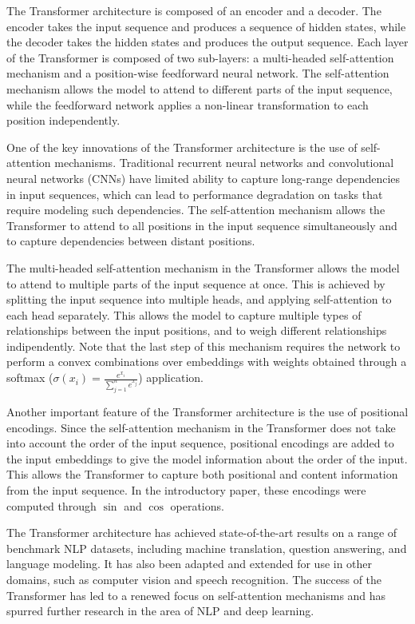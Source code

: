 \documentclass{article}
\begin{document}
The Transformer architecture is composed of an encoder and a decoder. The encoder takes the input sequence and produces a sequence of hidden states, while the decoder takes the hidden states and produces the output sequence. Each layer of the Transformer is composed of two sub-layers: a multi-headed self-attention mechanism and a position-wise feedforward neural network. The self-attention mechanism allows the model to attend to different parts of the input sequence, while the feedforward network applies a non-linear transformation to each position independently.

One of the key innovations of the Transformer architecture is the use of self-attention mechanisms. Traditional recurrent neural networks and convolutional neural networks (CNNs) have limited ability to capture long-range dependencies in input sequences, which can lead to performance degradation on tasks that require modeling such dependencies. The self-attention mechanism allows the Transformer to attend to all positions in the input sequence simultaneously and to capture dependencies between distant positions.

The multi-headed self-attention mechanism in the Transformer allows the model to attend to multiple parts of the input sequence at once. This is achieved by splitting the input sequence into multiple heads, and applying self-attention to each head separately. This allows the model to capture multiple types of relationships between the input positions, and to weigh different relationships indipendently. Note that the last step of this mechanism requires the network to perform a convex combinations over embeddings with weights obtained through a softmax ($\sigma(x_i) = \frac{e^{x_i}}{\sum_{j=1}^{n} e^{x_j}}$) application.

Another important feature of the Transformer architecture is the use of positional encodings. Since the self-attention mechanism in the Transformer does not take into account the order of the input sequence, positional encodings are added to the input embeddings to give the model information about the order of the input. This allows the Transformer to capture both positional and content information from the input sequence. In the introductory paper, these encodings were computed through $\sin$ and $\cos$ operations.

The Transformer architecture has achieved state-of-the-art results on a range of benchmark NLP datasets, including machine translation, question answering, and language modeling. It has also been adapted and extended for use in other domains, such as computer vision and speech recognition. The success of the Transformer has led to a renewed focus on self-attention mechanisms and has spurred further research in the area of NLP and deep learning.
\end{document}
